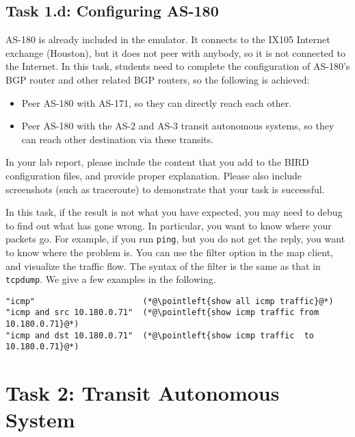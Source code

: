 \subsection{Task 1.d: Configuring AS-180} 

AS-180 is already included in the emulator. It connects to the
IX105 Internet exchange (Houston), but it does not peer with anybody, 
so it is not connected to the Internet. 
In this task, students need to complete the configuration of 
AS-180's BGP router and other related BGP routers, 
so the following is achieved:

\begin{itemize}[noitemsep]
  \item Peer AS-180 with AS-171, so they can directly reach each other.
  \item Peer AS-180 with the AS-2 and AS-3 transit autonomous systems, so they can
    reach other destination via these transits.
\end{itemize}

In your lab report, please include the content that you add to the 
BIRD configuration files, and provide proper explanation.
Please also include screenshots (such as traceroute) to demonstrate 
that your task is successful. 

In this task, if the result is not what you have expected, 
you may need to debug to find out what has gone wrong. In particular, 
you want to know where your packets go. For example, if you run \texttt{ping},
but you do not get the reply, you want to know where the problem is. You can
use the filter option in the map client, and visualize the traffic flow.  
The syntax of the filter is the same as that in \texttt{tcpdump}.
We give a few examples in the following.

\begin{lstlisting}
"icmp"                      (*@\pointleft{show all icmp traffic}@*) 
"icmp and src 10.180.0.71"  (*@\pointleft{show icmp traffic from 10.180.0.71}@*)
"icmp and dst 10.180.0.71"  (*@\pointleft{show icmp traffic  to 10.180.0.71}@*)
\end{lstlisting}
 


\section{Task 2: Transit Autonomous System} 

